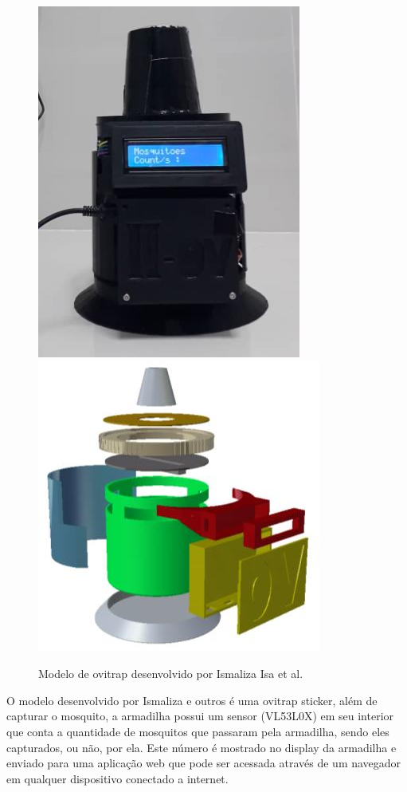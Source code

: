 \documentclass[
	12pt,				%
	openright,			%
	oneside,			%
	a4paper,			%
	chapter=TITLE,		%
	english,			%
	brazil				%
	]{abntex2}
\begin{document}
\begin{figure}[H]
\centering
\includegraphics[scale=0.4]{imagens/smartovitrap.png}
\includegraphics[scale=0.5]{imagens/smartovitrap2.png}
 \caption{Modelo de ovitrap desenvolvido por Ismaliza Isa et al. }
    \label{fig:ovitrapIsmaliza}
\end{figure}

O modelo desenvolvido por Ismaliza e outros é uma ovitrap sticker,
além de capturar o mosquito, a armadilha possui um sensor (VL53L0X) em seu interior que conta a
quantidade de mosquitos que passaram pela armadilha, sendo eles capturados, ou não, por
ela. Este número é mostrado no display da armadilha e enviado para uma aplicação web
que pode ser acessada através de um navegador em qualquer dispositivo conectado a
internet.
\end{document}
